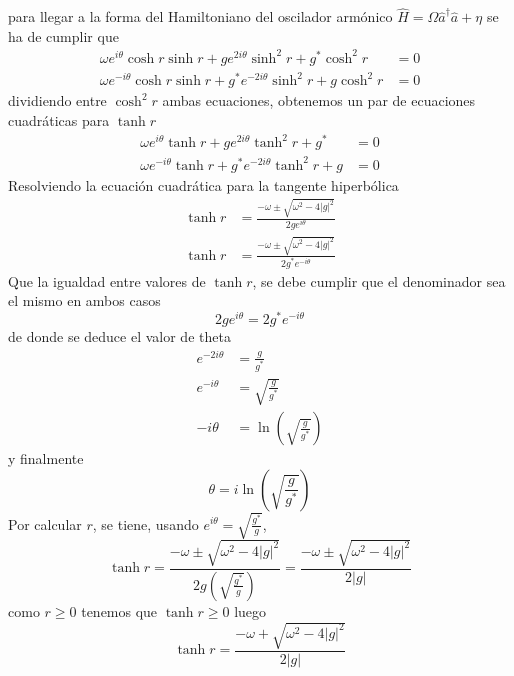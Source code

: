 para llegar a la forma del Hamiltoniano del oscilador armónico $\hat{H} = \Omega \hat{a}^{\dagger}\hat{a} + \eta$ se ha de cumplir que
\begin{align*}
  \omega e^{i\theta} \cosh{r}\sinh{r} + g e^{2i\theta}\sinh^2{r} + g^{*}\cosh^{2} {r}   & = 0 \\
  \omega e^{-i\theta} \cosh{r}\sinh{r} + g^{*} e^{-2i\theta} \sinh^2 {r} + g \cosh^2{r} & = 0
\end{align*}
dividiendo entre $\cosh^2{r}$ ambas ecuaciones, obtenemos un par de ecuaciones cuadráticas para $\tanh{r}$
\begin{align*}
  \omega e^{i\theta} \tanh{r} + g e^{2i\theta} \tanh^2 {r} + g^{*}   & = 0 \\
  \omega e^{-i\theta} \tanh{r} + g^{*} e^{-2i\theta} \tanh^2 {r} + g & = 0
\end{align*}
Resolviendo la ecuación cuadrática para la tangente hiperbólica
\begin{align*}
  \tanh{r} & = \frac{-\omega\pm \sqrt{\omega^2 - 4|g|^2}}{2ge^{i\theta}}      \\
  \tanh{r} & = \frac{-\omega\pm \sqrt{\omega^2 - 4|g|^2}}{2g^{*}e^{-i\theta}}
\end{align*}
Que la igualdad entre valores de $\tanh{r}$, se debe cumplir que el denominador sea el mismo en ambos casos
\begin{equation*}
  2 g e^{i\theta} = 2 g^{*} e^{-i\theta}
\end{equation*}
de donde se deduce el valor de theta
\begin{align*}
  e^{-2i\theta} & = \frac{g}{g^{*}}                         \\
  e^{-i\theta}  & = \sqrt{\frac{g}{g^{*}}}                  \\
  -i \theta     & = \ln\left(\sqrt{\frac{g}{g^{*}}} \right)
\end{align*}
y finalmente
\begin{equation*}
  \theta = i\ln \left(\sqrt{\frac{g}{g^{*}}} \right)
\end{equation*}
Por calcular $r$, se tiene, usando $e^{i\theta} = \sqrt{\frac{g^{*}}{g}}$,
\begin{equation*}
  \tanh{r} = \frac{-\omega \pm \sqrt{\omega^2 - 4|g|^2}}{2g\left( \sqrt{\frac{g^*}{g}} \right)} = \frac{-\omega \pm \sqrt{\omega^2 - 4|g|^2}}{2 \vert g \vert}
\end{equation*}
como $r\geq 0$ tenemos que $\tanh{r} \geq 0$ luego
\begin{equation*}
  \tanh{r} = \frac{-\omega + \sqrt{\omega^2 - 4|g|^2}}{2 \vert g \vert}
\end{equation*}
